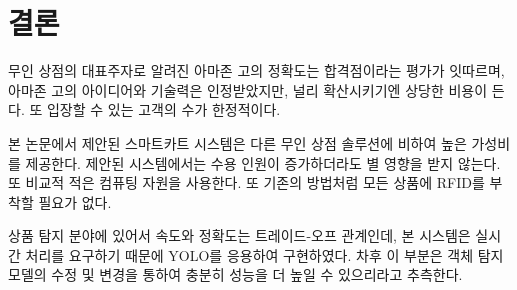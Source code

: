 \documentclass[smallextended]{svjour3}       %
\begin{document}
\hypertarget{uxacb0uxb860}{%
\section{결론}\label{uxacb0uxb860}}

무인 상점의 대표주자로 알려진 아마존 고의 정확도는 합격점이라는 평가가
잇따르며, 아마존 고의 아이디어와 기술력은 인정받았지만, 널리
확산시키기엔 상당한 비용이 든다. 또 입장할 수 있는 고객의 수가
한정적이다.

본 논문에서 제안된 스마트카트 시스템은 다른 무인 상점 솔루션에 비하여
높은 가성비를 제공한다. 제안된 시스템에서는 수용 인원이 증가하더라도 별
영향을 받지 않는다. 또 비교적 적은 컴퓨팅 자원을 사용한다. 또 기존의
방법처럼 모든 상품에 RFID를 부착할 필요가 없다.

상품 탐지 분야에 있어서 속도와 정확도는 트레이드-오프 관계인데, 본
시스템은 실시간 처리를 요구하기 때문에 YOLO를 응용하여 구현하였다. 차후
이 부분은 객체 탐지 모델의 수정 및 변경을 통하여 충분히 성능을 더 높일
수 있으리라고 추측한다.



\end{document}
